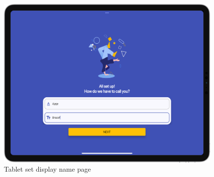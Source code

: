 \vspace*{-0.3cm}
\begin{figure}[H]
  \centering
    \includegraphics[scale=0.22]{./Images//Tablet_mocks/sign_up3_mod.png}
    \vspace*{-0.3cm}
    \caption{Tablet set display name page}
\end{figure}

